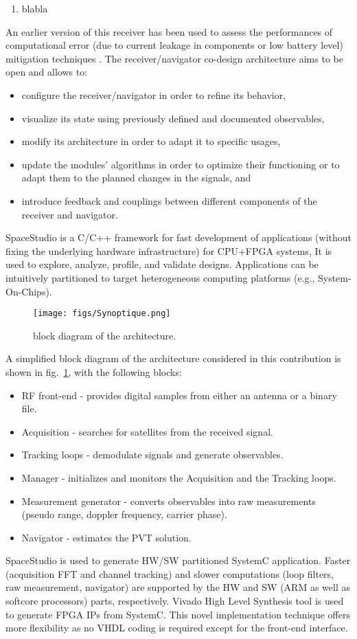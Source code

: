 \documentclass[conference]{IEEEtran}
\begin{document}
\begin{enumerate}
\item blabla
\end{enumerate}

An earlier version of this receiver has been used to assess the performances of computational error (due to current leakage in components or low battery level) mitigation techniques \cite{Haf16}.
The  receiver/navigator co-design architecture aims to be open and allows to:
\begin{itemize}
\item configure the receiver/navigator in order to refine its behavior,
\item visualize its state using previously defined and documented observables,
\item modify its architecture in order to adapt it to specific usages,
\item update the modules' algorithms in order to optimize their functioning or to adapt them to the planned changes in the signals, and
\item introduce feedback and couplings between different components of the receiver and navigator.
\end{itemize}


SpaceStudio is a C/C++ framework for fast development of applications (without fixing the underlying hardware infrastructure) for CPU+FPGA systems, 
It is used to explore, analyze, profile, and validate designs.
Applications can be intuitively partitioned to target heterogeneous computing platforms (e.g., System-On-Chips).
\begin{figure}[!ht]
\centerline{\texttt{[image: figs/Synoptique.png]}}
\caption{block diagram of the architecture.}
\label{fig:BlockDiag}
\end{figure}
A simplified block diagram of the architecture considered in this contribution is shown in fig.~\ref{fig:BlockDiag}, with the following blocks:
\begin{itemize}
\item RF front-end - provides digital samples from either an antenna or a binary file.
\item Acquisition - searches for satellites from the received signal.
\item Tracking loops - demodulate signals and generate observables.
\item Manager - initializes and monitors the Acquisition and the Tracking loops.
\item Measurement generator - converts observables into raw measurements (pseudo range, doppler frequency, carrier phase).
\item Navigator - estimates the PVT solution.
\end{itemize}  
SpaceStudio is used to generate HW/SW partitioned SystemC application. Faster (acquisition FFT and channel tracking) and slower computations (loop filters, raw measurement, navigator) are supported by the HW and SW (ARM as well as softcore processors) parts, respectively. 
Vivado High Level Synthesis tool is used to generate FPGA IPs from SystemC.
This novel implementation technique offers more flexibility as no VHDL coding is required except for the front-end interface.
\end{document}
